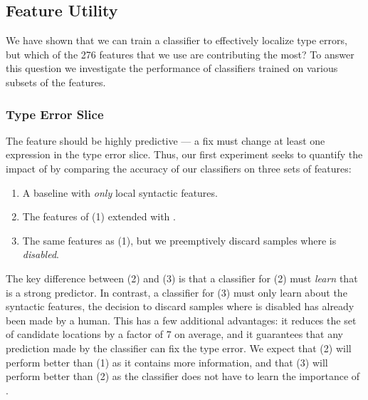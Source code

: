 \subsection{Feature Utility}
\label{sec:feature-utility}
We have shown that we can train a classifier to effectively localize
type errors, but which of the 276 features that we use are contributing
the most?
%
To answer this question we investigate the performance of
classifiers trained on various subsets of the features.

\subsubsection{Type Error Slice}
\label{sec:type-error-slice}
The \InSlice feature should be highly predictive --- a fix must change
at least one expression in the type error slice.
%
Thus, our first experiment seeks to quantify the impact of \InSlice by
comparing the accuracy of our classifiers on three sets of features:
%
\begin{enumerate}
\item A baseline with \emph{only} local syntactic features.
\item The features of (1) extended with \InSlice.
\item The same features as (1), but we preemptively discard samples
  where \InSlice is \emph{disabled}.
\end{enumerate}
%
The key difference between (2) and (3) is that a classifier for (2) must
\emph{learn} that \InSlice is a strong predictor.
%
In contrast, a classifier for (3) must only learn about the syntactic
features, the decision to discard samples where \InSlice is disabled has
already been made by a human.
%
This has a few additional advantages: it reduces the set of candidate
locations by a factor of 7 on average, and it guarantees that any
prediction made by the classifier can fix the type error.
%
We expect that (2) will perform better than (1) as it contains more
information, and that (3) will perform better than (2) as the classifier
does not have to learn the importance of \InSlice.


